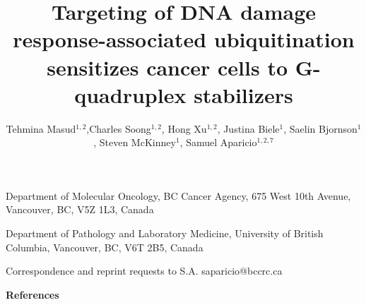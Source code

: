 \documentclass{nature}
\title{\textsf{\textbf{Targeting of DNA damage response-associated ubiquitination sensitizes cancer cells to G-quadruplex stabilizers}}}
\author{Tehmina Masud$^{1,2}$,Charles Soong$^{1,2}$, Hong Xu$^{1,2}$, Justina Biele$^{1}$, Saelin Bjornson$^{1}$, Steven McKinney$^{1}$, Samuel Aparicio$^{1,2,7}$}
\begin{document}
\maketitle
\begin{affiliations}
\item Department of Molecular Oncology, BC Cancer Agency, 675 West 10th Avenue, Vancouver, BC, V5Z 1L3, Canada
\item Department of Pathology and Laboratory Medicine, University of British Columbia, Vancouver, BC, V6T 2B5, Canada
\item Correspondence and reprint requests to S.A. saparicio@bccrc.ca
\end{affiliations}


\newpage
\begin{abstract}
    
\end{abstract}

\newpage


\begin{results}
    
\end{results}

\newpage


\newpage


\newpage
\begin{methods}

\end{methods}

\newpage
\textbf{References}




\end{document}
